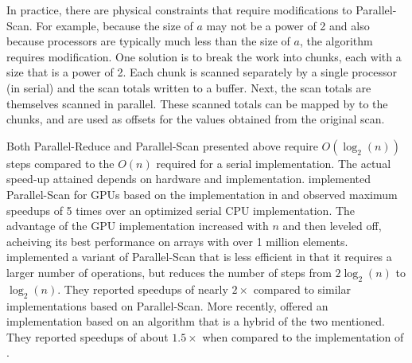 {%

In practice, there are physical constraints that require modifications to Parallel-Scan. For example, because the size of $a$ may not be a power of 2 and also because processors are typically much less than the size of $a$, the algorithm requires modification. One solution is to break the work into chunks, each with a size that is a power of 2. Each chunk is scanned separately by a single processor (in serial) and the scan totals written to a buffer. Next, the scan totals are themselves scanned in parallel. These scanned totals can be mapped by to the chunks, and are used as offsets for the values obtained from the original scan.

Both Parallel-Reduce and Parallel-Scan presented above require $O(\log_2(n))$ steps compared to the $O(n)$ required for a serial implementation. 
The actual speed-up attained depends on hardware and implementation. \citet{harris-scan} implemented Parallel-Scan for GPUs based on the implementation in \citet{blelloch1990} and observed maximum speedups of 5 times over an optimized serial CPU implementation. The advantage of the GPU implementation increased with $n$ and then leveled off, acheiving its best performance on arrays with over 1 million elements. \citet{sengupta2008} implemented a variant of Parallel-Scan that is less efficient in that it requires a larger number of operations, but reduces the number of steps from $2\log_2(n)$ to $\log_2(n)$. They reported speedups of nearly $2\times$ compared to similar implementations based on Parallel-Scan. More recently, \citet{ha2013} offered an implementation based on an algorithm that is a hybrid of the two mentioned. They reported speedups of about $1.5\times$ when compared to the implementation of \citet{sengupta2008}.

}

